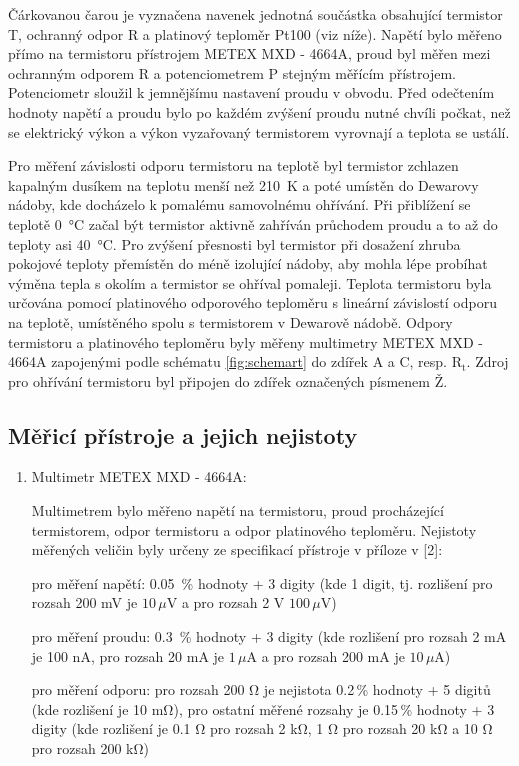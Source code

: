 \documentclass{../concepts/prepareprotokol} %
\begin{document}
Čárkovanou čarou je vyznačena navenek jednotná součástka obsahující termistor T, ochranný odpor R a platinový teploměr Pt100 (viz níže). Napětí bylo měřeno přímo na termistoru přístrojem METEX MXD - 4664A, proud byl měřen mezi ochranným odporem R a potenciometrem P stejným měřícím přístrojem. Potenciometr sloužil k jemnějšímu nastavení proudu v obvodu. Před odečtením hodnoty napětí a proudu bylo po každém zvýšení proudu nutné chvíli počkat, než se elektrický výkon a výkon vyzařovaný termistorem vyrovnají a teplota se ustálí.

Pro měření závislosti odporu termistoru na teplotě byl termistor zchlazen kapalným dusíkem na teplotu menší než \SI{210}{\kelvin} a poté umístěn do Dewarovy nádoby, kde docházelo k pomalému samovolnému ohřívání. Při přiblížení se teplotě \SI{0}{\celsius} začal být termistor aktivně zahříván průchodem proudu a to až do teploty asi \SI{40}{\celsius}. Pro zvýšení přesnosti byl termistor při dosažení zhruba pokojové teploty přemístěn do méně izolující nádoby, aby mohla lépe probíhat výměna tepla s okolím a termistor se ohříval pomaleji. Teplota termistoru byla určována pomocí platinového odporového teploměru s lineární závislostí odporu na teplotě, umístěného spolu s termistorem v Dewarově nádobě. Odpory termistoru a platinového teploměru byly měřeny multimetry METEX MXD - 4664A zapojenými podle schématu \ref{fig:schemart} do zdířek A a C, resp. $\mathrm{R_t}$. Zdroj pro ohřívání termistoru byl připojen do zdířek označených písmenem Ž.






\subsection{Měřicí přístroje a jejich nejistoty}
\begin{enumerate}
    \item Multimetr METEX MXD - 4664A:
    
    Multimetrem bylo měřeno napětí na termistoru, proud procházející termistorem, odpor termistoru a odpor platinového teploměru. Nejistoty měřených veličin byly určeny ze specifikací přístroje v příloze v [2]:

    pro měření napětí: 0.05 \,\% hodnoty + 3 digity (kde 1 digit, tj. rozlišení pro rozsah 200 mV je $10\, \mu$V a pro rozsah 2 V $100\,\mu$V)

    pro měření proudu: 0.3 \,\% hodnoty + 3 digity (kde rozlišení pro rozsah 2 mA je 100 nA, pro rozsah 20 mA je $1\,\mu$A a pro rozsah 200 mA je $10\,\mu$A)

    pro měření odporu: pro rozsah 200 \si{\ohm} je nejistota 0.2\,\% hodnoty + 5 digitů (kde rozlišení je 10 \si{\milli \ohm}), pro ostatní měřené rozsahy je 0.15\,\% hodnoty + 3 digity (kde rozlišení je 0.1 \si{\ohm} pro rozsah 2 \si{\kilo\ohm}, 1 \si{\ohm} pro rozsah 20 \si{\kilo\ohm} a 10 \si{\ohm} pro rozsah 200 \si{\kilo\ohm})

\end{enumerate}
\def\figurename{Graf}%
\setcounter{figure}{0}
\end{document}
